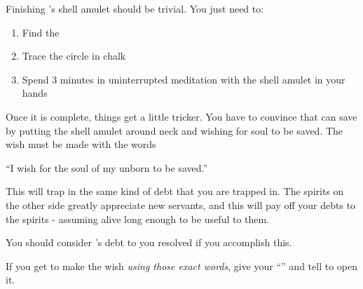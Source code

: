 \documentclass[green]{NeptuneBall}
\begin{document}
\name{\gAmulet{}}

Finishing \cAriel{}'s shell amulet should be trivial. You just need to:
\begin{enumerate}
\item Find the \sRunicCircle{}
\item Trace the circle in chalk
\item Spend 3 minutes in uninterrupted meditation with the shell amulet in your hands
\end{enumerate}

Once it is complete, things get a little tricker. You have to convince \cAriel{} that \cAriel{\they} can save \cAriel{\their} \cArielsSon{\offspring} by putting the shell amulet around \cAriel{\their} neck and wishing for \cArielsSon{\their} soul to be saved. The wish must be made with the words

``I wish for the soul of my unborn \cArielsSon{} to be saved.''

This will trap \cAriel{} in the same kind of debt that you are trapped in. The spirits on the other side greatly appreciate new servants, and this will pay off your debts to the spirits - assuming \cAriel{\they}  alive long enough to be useful to them.

You should consider \cAriel{}'s debt to you resolved if you accomplish this.

If you get \cAriel{} to make the wish \emph{using those exact words}, give \cAriel{\them} your ``\mMEnvelope{\MYname}'' and tell \cAriel{\them} to open it.
\end{document}

